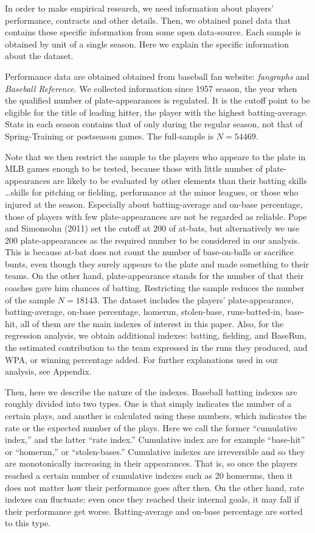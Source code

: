 \documentclass[dvipdfmx, 12pt]{article}
\begin{document}
In order to make empirical research, we need information about players' performance, contracts and other details. Then, we obtained panel data that contains these specific information from some open data-source. Each sample is obtained by unit of a single season. Here we explain the specific information about the dataset.

Performance data are obtained obtained from baseball fan website:  \textit{fangraphs} and \textit{Baseball Reference}. We collected information since 1957 season, the year when the qualified number of plate-appearances is regulated. It is the cutoff point to be eligible for the title of leading hitter, the player with the highest batting-average. Stats in each season contains that of only during the regular season, not that of Spring-Training or postseason games. The full-sample is $N=54469$.

Note that we then restrict the sample to the players who appeare to the plate in MLB games enough to be tested, because those with little number of plate-appearances are likely to be evaluated by other elements than their batting skills \ldots skills for pitching or fielding, performance at the minor leagues, or those who injured at the season. Especially about batting-average and on-base percentage, those of players with few plate-appearances are not be regarded as reliable. Pope and Simonsohn (2011) set the cutoff at 200 of at-bats, but alternatively we use 200 plate-appearances as the required number to be considered in our analysis. This is because at-bat does not count the number of base-on-balls or sacrifice bunts, even though they surely appears to the plate and made something to their teams. On the other hand, plate-appearance stands for the number of that their coaches gave him chances of batting. Restricting the sample reduces the number of the sample $N=18143$. The dataset includes the players' plate-appearance, batting-average, on-base percentage, homerun, stolen-base, runs-batted-in, base-hit, all of them are the main indexes of interest in this paper. Also, for the regression analysis, we obtain additional indexes: batting, fielding, and BaseRun, the estimated contribution to the team expressed in the runs they produced, and WPA, or winning percentage added. For further explanations used in our analysis, see Appendix.

Then, here we describe the nature of the indexes. Baseball batting indexes are roughly divided into two types. One is that simply indicates the number of a certain plays, and another is calculated using these numbers, which indicates the rate or the expected number of the plays. Here we call the former ``cumulative index,'' and the latter ``rate index.'' Cumulative index are for example ``base-hit'' or ``homerun,'' or ``stolen-bases.'' Cumulative indexes are irreversible and so they are monotonically increasing in their appearances. That is, so once the players reached a certain number of cumulative indexes such as 20 homeruns, then it does not matter how their performance goes after then. On the other hand, rate indexes can fluctuate: even once they reached their internal goals, it may fall if their performance get worse. Batting-average and on-base percentage are sorted to this type.
\end{document}
